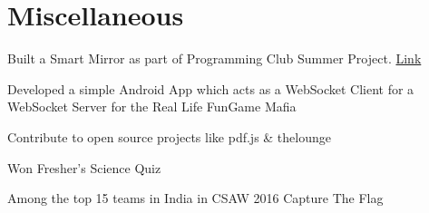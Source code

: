 \documentclass[]{deedy-resume-openfont}
\begin{document}
\begin{minipage}[t]{0.66\textwidth}
\section{Miscellaneous}
\vspace{\topsep}
\begin{tightemize}
\item Built a Smart Mirror as part of Programming Club Summer Project.
  \href{https://pclub.in/project/2016/07/06/smartmirror.html}{Link}
\item Developed a simple Android App which acts as a WebSocket Client
  for a WebSocket Server for the Real Life FunGame Mafia
\item Contribute to open source projects like pdf.js \& thelounge
\item Won Fresher\textquoteright{}s Science Quiz
\item Among the top 15 teams in India in CSAW 2016 Capture The Flag
\end{tightemize}
\end{minipage} 
\end{document}
